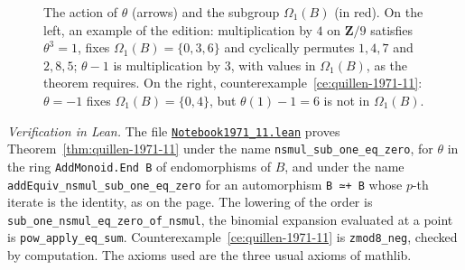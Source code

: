 \begin{figure}[htbp]
\centering
{}
\caption{The action of $\theta$ (arrows) and the subgroup $\Omega_1(B)$ (in red). On the left, an example of the edition: multiplication by $4$ on $\mathbf Z/9$ satisfies $\theta^3 = 1$, fixes $\Omega_1(B) = \{0, 3, 6\}$ and cyclically permutes $1, 4, 7$ and $2, 8, 5$; $\theta - 1$ is multiplication by $3$, with values in $\Omega_1(B)$, as the theorem requires. On the right, counterexample~\ref{ce:quillen-1971-11}: $\theta = -1$ fixes $\Omega_1(B) = \{0, 4\}$, but $\theta(1) - 1 = 6$ is not in $\Omega_1(B)$.}
\label{fig:quillen-1971-11}
\end{figure}

\emph{Verification in Lean.} The file \href{\leanblobmain/Notebook1971_11.lean}{\texttt{Notebook1971\_11.\allowbreak{}lean}} proves Theorem~\ref{thm:quillen-1971-11} under the name \texttt{nsmul\_sub\_one\_eq\_zero}, for $\theta$ in the ring \texttt{AddMonoid.End B} of endomorphisms of $B$, and under the name \texttt{addEquiv\_nsmul\_sub\_one\_eq\_zero} for an automorphism \texttt{B ≃+ B} whose $p$-th iterate is the identity, as on the page. The lowering of the order is \texttt{sub\_one\_nsmul\_eq\_zero\_of\_nsmul}, the binomial expansion evaluated at a point is \texttt{pow\_apply\_eq\_sum}. Counterexample~\ref{ce:quillen-1971-11} is \texttt{zmod8\_neg}, checked by computation. The axioms used are the three usual axioms of mathlib.


